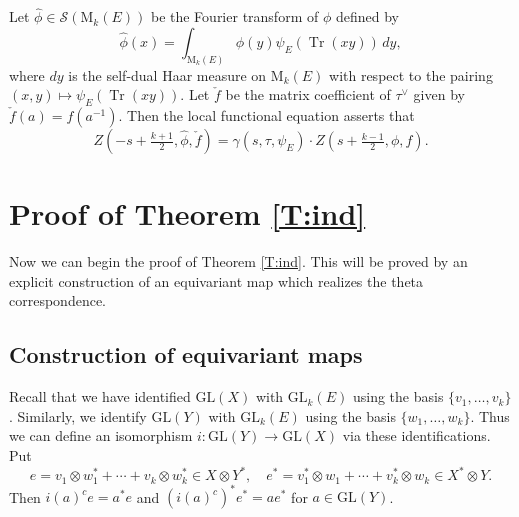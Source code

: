 \documentclass[11pt]{amsart}
\numberwithin{equation}{section}
\theoremstyle{plain}
\theoremstyle{definition}
\theoremstyle{remark}
\def\Tr{\operatorname{Tr}}
\def\GL{\mathrm{GL}}
\def\s{\mathscr{S}}
\begin{document}
Let $\hat{\phi} \in \s(\mathrm{M}_k(E))$ be the Fourier transform of $\phi$ defined by 
\[
 \hat{\phi}(x) = \int_{\mathrm{M}_k(E)} \phi(y) \psi_E(\Tr(xy)) \, dy,
\]
where $dy$ is the self-dual Haar measure on ${\mathrm{M}_k(E)}$ with respect to the pairing $(x, y) \mapsto \psi_E(\Tr(xy))$.
Let $\check{f}$ be the matrix coefficient of $\tau^\vee$ given by $\check{f}(a) = f(a^{-1})$.
Then the local functional equation asserts that
\[
 Z(-s+\tfrac{k+1}{2}, \hat{\phi}, \check{f}) = \gamma(s, \tau, \psi_E) \cdot Z(s+\tfrac{k-1}{2}, \phi, f). 
\]

\section{\textbf{Proof of Theorem \ref{T:ind}}}

Now we can begin the proof of Theorem \ref{T:ind}.
This will be proved by an explicit construction of an equivariant map which realizes the theta correspondence. 

\subsection{Construction of equivariant maps}

Recall that we have identified $\GL(X)$ with $\GL_k(E)$ using the basis $\{ v_1, \ldots, v_k \}$.
Similarly, we identify $\GL(Y)$ with $\GL_k(E)$ using the basis $\{ w_1, \ldots, w_k \}$.
Thus we can define an isomorphism $i:\GL(Y) \rightarrow \GL(X)$ via these identifications.
Put 
\[
 e = v_1 \otimes w_1^* + \cdots + v_k \otimes w_k^* \in X \otimes Y^*, \quad
 e^* = v^*_1 \otimes w_1 + \cdots + v_k^* \otimes w_k \in X^* \otimes Y.
\]
Then $i(a)^c e = a^* e$ and $(i(a)^c)^* e^* = a e^*$ for $a \in \GL(Y)$.
\end{document}
